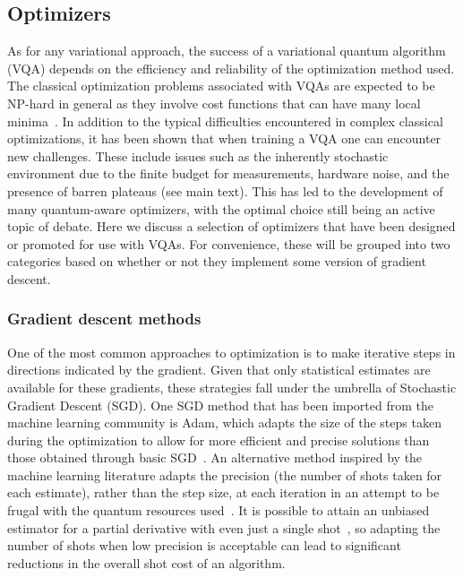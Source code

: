 \documentclass[prx,twocolumn,floatfix,superscriptaddress,longbibliography]{revtex4-1}
\newcommand{\<}{\langle}
\renewcommand{\>}{\rangle}
\begin{document}
\subsection{Optimizers}\label{sec:optimizers}

As for any variational approach, the success of a variational quantum algorithm (VQA) depends on the efficiency and reliability of the optimization method used. The classical optimization problems associated with VQAs are expected to be NP-hard in general as they involve cost functions that can have many local minima~\cite{bittel2021training}. In addition to the typical difficulties encountered in complex classical optimizations, it has been shown that when training a VQA one can encounter new challenges. These include issues such as the inherently stochastic environment due to the finite budget for measurements, hardware noise, and the presence of barren plateaus (see main text). This has led to the development of many quantum-aware optimizers, with the optimal choice still being an  active topic of debate. Here we discuss a selection of optimizers that have been designed or promoted for use with VQAs. For convenience, these will be grouped into two categories based on whether or not they implement some version of gradient descent. 

\subsubsection{Gradient descent methods} One of the most common approaches to optimization is to make iterative steps in directions indicated by the gradient. Given that only statistical estimates are available for these gradients, these strategies fall under the umbrella of Stochastic Gradient Descent (SGD). One SGD method that has been imported from the machine learning community is Adam, which adapts the size of the steps taken during the optimization to allow for more efficient and precise solutions than those obtained through basic SGD~\cite{Kingma2015}. An alternative method inspired by the machine learning literature  adapts the precision (the number of shots taken for each estimate), rather than the step size, at each iteration in an attempt to be frugal with the quantum resources used~\cite{kubler2019adaptive}. It is possible to attain an unbiased estimator for a partial derivative with even just a single shot~\cite{sweke2019stochastic}, so adapting the number of shots when low precision is acceptable can lead to significant reductions in the overall shot cost of an algorithm.
    
\end{document}
